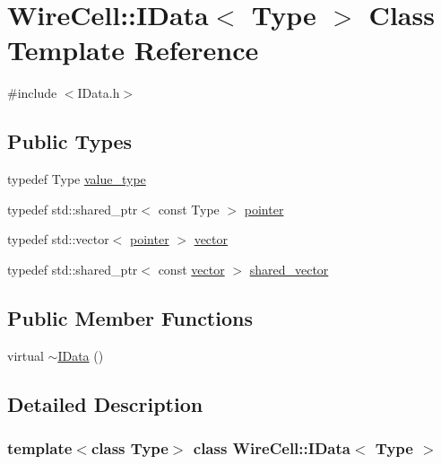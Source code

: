 \hypertarget{class_wire_cell_1_1_i_data}{}\section{Wire\+Cell\+:\+:I\+Data$<$ Type $>$ Class Template Reference}
\label{class_wire_cell_1_1_i_data}


{\ttfamily \#include $<$I\+Data.\+h$>$}

\subsection*{Public Types}
\begin{DoxyCompactItemize}
\item 
typedef Type \hyperlink{class_wire_cell_1_1_i_data_a8cd5758b536f009da111eefc54c20680}{value\+\_\+type}
\item 
typedef std\+::shared\+\_\+ptr$<$ const Type $>$ \hyperlink{class_wire_cell_1_1_i_data_aff870b3ae8333cf9265941eef62498bc}{pointer}
\item 
typedef std\+::vector$<$ \hyperlink{class_wire_cell_1_1_i_data_aff870b3ae8333cf9265941eef62498bc}{pointer} $>$ \hyperlink{class_wire_cell_1_1_i_data_ae1a9f863380499bb43f39fabb6276660}{vector}
\item 
typedef std\+::shared\+\_\+ptr$<$ const \hyperlink{class_wire_cell_1_1_i_data_ae1a9f863380499bb43f39fabb6276660}{vector} $>$ \hyperlink{class_wire_cell_1_1_i_data_a6edac35e7dd886018740993b28c7ca1e}{shared\+\_\+vector}
\end{DoxyCompactItemize}
\subsection*{Public Member Functions}
\begin{DoxyCompactItemize}
\item 
virtual \hyperlink{class_wire_cell_1_1_i_data_a4973803d3325401af543a68d7e3e7707}{$\sim$\+I\+Data} ()
\end{DoxyCompactItemize}


\subsection{Detailed Description}
\subsubsection*{template$<$class Type$>$\newline
class Wire\+Cell\+::\+I\+Data$<$ Type $>$}



